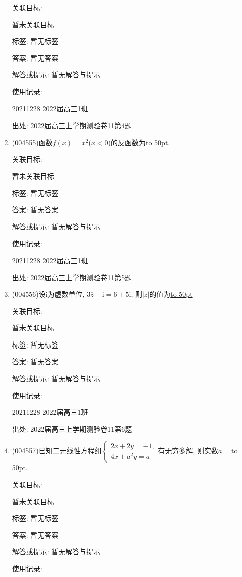 \documentclass[10pt,a4paper]{article}
\newcommand{\blank}[1]{\underline{\hbox to #1pt{}}}
\begin{document}
\begin{enumerate}[1.]
关联目标:

暂未关联目标



标签: 暂无标签

答案: 暂无答案

解答或提示: 暂无解答与提示

使用记录:

20211228	2022届高三1班	


出处: 2022届高三上学期测验卷11第4题
\item { (004555)}函数$f(x)=x^2$($x<0$)的反函数为\blank{50}.


关联目标:

暂未关联目标



标签: 暂无标签

答案: 暂无答案

解答或提示: 暂无解答与提示

使用记录:

20211228	2022届高三1班	


出处: 2022届高三上学期测验卷11第5题
\item { (004556)}设$\mathrm{i}$为虚数单位, $3\overline{z}-\mathrm{i}=6+5\mathrm{i}$, 则$|z|$的值为\blank{50}


关联目标:

暂未关联目标



标签: 暂无标签

答案: 暂无答案

解答或提示: 暂无解答与提示

使用记录:

20211228	2022届高三1班	


出处: 2022届高三上学期测验卷11第6题
\item { (004557)}已知二元线性方程组$\begin{cases}
    2x+2y=-1, \\ 4x+a^2y=a
\end{cases}$有无穷多解, 则实数$a=$\blank{50}.


关联目标:

暂未关联目标



标签: 暂无标签

答案: 暂无答案

解答或提示: 暂无解答与提示

使用记录:


\end{enumerate}
\end{document}
